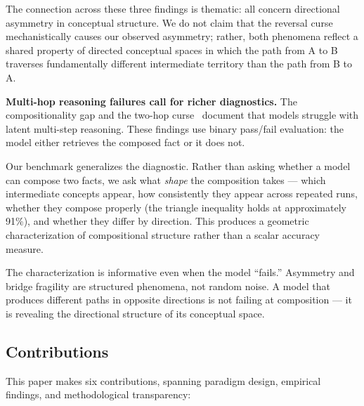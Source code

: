 The connection across these three findings is thematic: all concern directional asymmetry in conceptual structure. We do not claim that the reversal curse mechanistically causes our observed asymmetry; rather, both phenomena reflect a shared property of directed conceptual spaces in which the path from A to B traverses fundamentally different intermediate territory than the path from B to A.

\textbf{Multi-hop reasoning failures call for richer diagnostics.} The compositionality gap \citep{press2022compositionality} and the two-hop curse~\citep{twohopcurse2025} document that models struggle with latent multi-step reasoning. These findings use binary pass/fail evaluation: the model either retrieves the composed fact or it does not.

Our benchmark generalizes the diagnostic. Rather than asking whether a model can compose two facts, we ask what \emph{shape} the composition takes --- which intermediate concepts appear, how consistently they appear across repeated runs, whether they compose properly (the triangle inequality holds at approximately 91\%), and whether they differ by direction. This produces a geometric characterization of compositional structure rather than a scalar accuracy measure.

The characterization is informative even when the model ``fails.'' Asymmetry and bridge fragility are structured phenomena, not random noise. A model that produces different paths in opposite directions is not failing at composition --- it is revealing the directional structure of its conceptual space.

\subsection{Contributions}\label{contributions}

This paper makes six contributions, spanning paradigm design, empirical findings, and methodological transparency:

